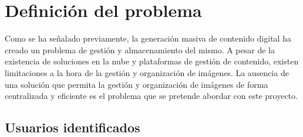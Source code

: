 \section{Definición del problema}

Como se ha señalado previamente, la generación masiva de contenido digital ha creado un problema de gestión y almacenamiento del mismo. A pesar de la existencia de
soluciones en la nube y plataformas de gestión de contenido, existen limitaciones a la hora de la gestión y organización de imágenes. La ausencia de una solución que
permita la gestión y organización de imágenes de forma centralizada y eficiente es el problema que se pretende abordar con este proyecto.

    \subsection{Usuarios identificados}

